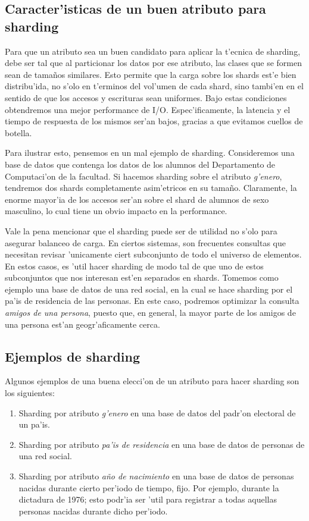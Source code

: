 \subsection{Caracter'isticas de un buen atributo para sharding}

Para que un atributo sea un buen candidato para aplicar la t'ecnica de sharding, debe ser tal que al particionar los datos por ese atributo, las clases que se formen sean de tama\~nos similares. Esto permite que la carga sobre los shards est'e bien distribu'ida, no s'olo en t'erminos del vol'umen de cada shard, sino tambi'en en el sentido de que los accesos y escrituras sean uniformes. Bajo estas condiciones obtendremos una mejor performance de I/O. Espec'ificamente, la latencia y el tiempo de respuesta de los mismos ser'an bajos, gracias a que evitamos cuellos de botella.

Para ilustrar esto, pensemos en un mal ejemplo de sharding. Consideremos una base de datos que contenga los datos de los alumnos del Departamento de Computaci'on de la facultad. Si hacemos sharding sobre el atributo \emph{g'enero}, tendremos dos shards completamente asim'etricos en su tama\~no. Claramente, la enorme mayor'ia de los accesos ser'an sobre el shard de alumnos de sexo masculino, lo cual tiene un obvio impacto en la performance.

Vale la pena mencionar que el sharding puede ser de utilidad no s'olo para asegurar balanceo de carga. En ciertos sistemas, son frecuentes consultas que necesitan revisar 'unicamente ciert subconjunto de todo el universo de elementos. En estos casos, es 'util hacer sharding de modo tal de que uno de estos subconjuntos que nos interesan est'en separados en shards. Tomemos como ejemplo una base de datos de una red social, en la cual se hace sharding por el pa'is de residencia de las personas. En este caso, podremos optimizar la consulta \textit{amigos de una persona}, puesto que, en general, la mayor parte de los amigos de una persona est'an geogr'aficamente cerca.

\subsection{Ejemplos de sharding}

Algunos ejemplos de una buena elecci'on de un atributo para hacer sharding son los siguientes:

\begin{enumerate}
	\item Sharding por atributo \emph{g'enero} en una base de datos del padr'on electoral de un pa'is.
	\item Sharding por atributo \emph{pa'is de residencia} en una base de datos de personas de una red social.
	\item Sharding por atributo \emph{a\~no de nacimiento} en una base de datos de personas nacidas durante cierto per'iodo de tiempo, fijo. Por ejemplo, durante la dictadura de 1976; esto podr'ia ser 'util para registrar a todas aquellas personas nacidas durante dicho per'iodo.
\end{enumerate}

